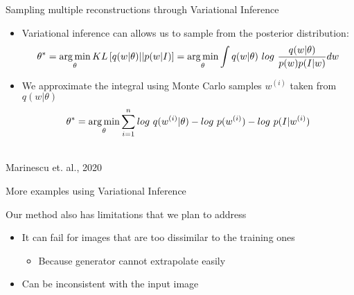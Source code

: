 \begin{frame}{Sampling multiple reconstructions through Variational Inference}
 
 \begin{itemize}
  \item Variational inference can allows us to sample from the posterior distribution:
$$\theta^* = \argmin_{\theta} KL\left[q(w|\theta)||p(w|I)\right] = \argmin_{\theta} \int q(w|\theta)\ log\ \frac{q(w|\theta)}{p(w)p(I|w)} dw$$
   
   
   \item We approximate the integral using Monte Carlo samples $w^{(i)}$ taken from $q(w|\theta)$
$$\theta^* = \operatorname*{arg\,min}_{\theta} \sum_{i=1}^n log\ q(w^{(i)}|\theta) - log\ p(w^{(i)}) -  log\  p(I|w^{(i)})$$

 \end{itemize}
 
 \begin{center}
\\

Marinescu et. al., 2020
 \end{center}

 
 
\end{frame}


\begin{frame}{More examples using Variational Inference}
 
\begin{center}
 
\end{center}

 
 
\end{frame}




\begin{frame}{Our method also has limitations that we plan to address}

\begin{itemize}
 \item It can fail for images that are too dissimilar to the training ones
 \begin{itemize}
 \item Because generator cannot extrapolate easily
 \end{itemize}
 \begin{center}
 \end{center}
 
 \item Can be inconsistent with the input image
 \begin{center}
 \end{center}
 
\end{itemize}
 
\end{frame}


